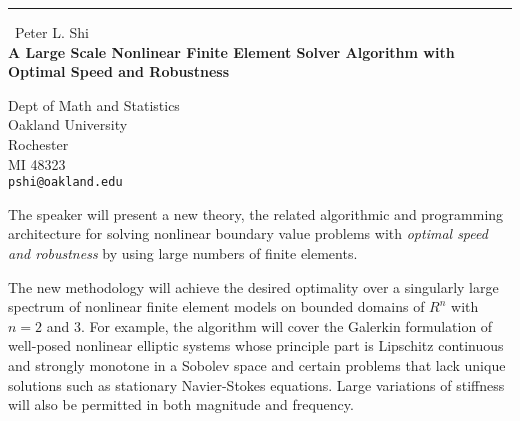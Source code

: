 \documentclass{report}
\begin{document}
\begin{center}
\rule{6in}{1pt} \
{\large Peter L. Shi \\
{\bf A Large Scale Nonlinear Finite Element Solver Algorithm with Optimal Speed and Robustness}}

Dept of Math and Statistics \\ Oakland University \\ Rochester \\ MI 48323
\\
{\tt pshi@oakland.edu}\end{center}

The speaker will present a new theory, the related algorithmic and
programming architecture for solving nonlinear boundary value problems
with {\it optimal speed and robustness} by using large numbers of finite
elements.


The new methodology will achieve the desired optimality
over a singularly large spectrum of nonlinear finite element models on
bounded domains of $R^n$ with $n=2$ and 3.
For example, the algorithm will cover the Galerkin formulation
of well-posed nonlinear elliptic systems whose principle part is
Lipschitz continuous and strongly monotone in a Sobolev space and certain
problems that lack unique solutions such as stationary Navier-Stokes
equations. Large variations of stiffness will also be permitted in both
magnitude and frequency.
\end{document}
